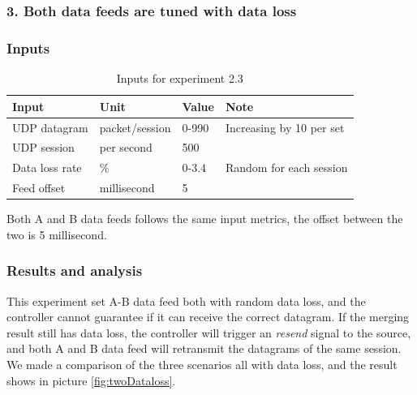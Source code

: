 \documentclass[11pt,openright,a4paper]{report}
\begin{document}
\subsubsection{3. Both data feeds are tuned with data loss}
\subsubsection{Inputs}
\begin{table}[H]
	\centering
	\caption{Inputs for experiment 2.3}
	\label{my-label}
	\begin{tabular}{@{}llll@{}}
		\toprule
		Input          & Unit           & Value  & Note                     \\ \midrule
		UDP datagram   & packet/session & 0-990 & Increasing by 10 per set \\ 
		UDP session    & per second     & 500    & 							\\
		Data loss rate & \%             & 0-3.4  & Random for each session  \\
		Feed offset & millisecond   & 5         &                                \\ \bottomrule
	\end{tabular}
\end{table}
Both A and B data feeds follows the same input metrics, the offset between the two is 5 millisecond.\\
\subsubsection{Results and analysis}
This experiment set A-B data feed both with random data loss, and the controller cannot guarantee if it can receive the correct datagram. If the merging result still has data loss, the controller will trigger an \textit{resend} signal to the source, and both A and B data feed will retransmit the datagrams of the same session.\\
We made a comparison of the three scenarios all with data loss, and the result shows in picture \ref{fig:twoDataloss}.
\end{document}
